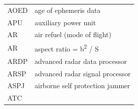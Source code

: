 \documentclass[
]{book}
\begin{document}
\begin{longtable}[]{@{}ll@{}}
\begin{minipage}[t]{0.47\columnwidth}
AOED\strut
\end{minipage} & \begin{minipage}[t]{0.47\columnwidth}\raggedright
age of ephemeris data\strut
\end{minipage}\tabularnewline
\begin{minipage}[t]{0.47\columnwidth}\raggedright
APU\strut
\end{minipage} & \begin{minipage}[t]{0.47\columnwidth}\raggedright
auxiliary power unit\strut
\end{minipage}\tabularnewline
\begin{minipage}[t]{0.47\columnwidth}\raggedright
AR\strut
\end{minipage} & \begin{minipage}[t]{0.47\columnwidth}\raggedright
air refuel (mode of flight)\strut
\end{minipage}\tabularnewline
\begin{minipage}[t]{0.47\columnwidth}\raggedright
AR\strut
\end{minipage} & \begin{minipage}[t]{0.47\columnwidth}\raggedright
aspect ratio = b\textsuperscript{2} / S\strut
\end{minipage}\tabularnewline
\begin{minipage}[t]{0.47\columnwidth}\raggedright
ARDP\strut
\end{minipage} & \begin{minipage}[t]{0.47\columnwidth}\raggedright
advanced radar data processor\strut
\end{minipage}\tabularnewline
\begin{minipage}[t]{0.47\columnwidth}\raggedright
ARSP\strut
\end{minipage} & \begin{minipage}[t]{0.47\columnwidth}\raggedright
advanced radar signal processor\strut
\end{minipage}\tabularnewline
\begin{minipage}[t]{0.47\columnwidth}\raggedright
ASPJ\strut
\end{minipage} & \begin{minipage}[t]{0.47\columnwidth}\raggedright
airborne self protection jammer\strut
\end{minipage}\tabularnewline
\begin{minipage}[t]{0.47\columnwidth}\raggedright
ATC\strut
\end{minipage} & \begin{minipage}[t]{0.47\columnwidth}\raggedright

\end{minipage}
\end{longtable}
\end{document}
